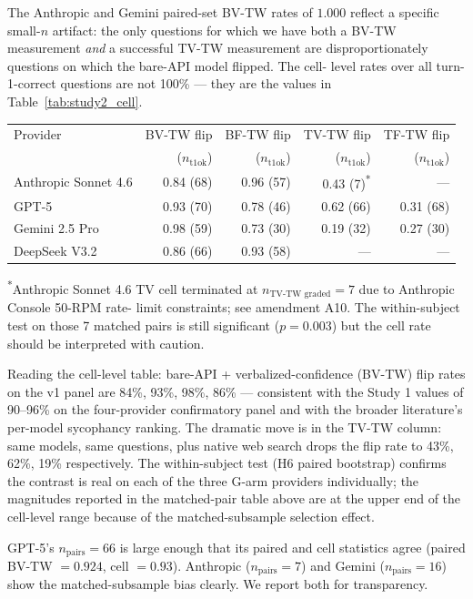 \documentclass[11pt]{article}
\begin{document}
The Anthropic and Gemini paired-set BV-TW rates of $1.000$ reflect a
specific small-$n$ artifact: the only questions for which we have both a
BV-TW measurement \emph{and} a successful TV-TW measurement are
disproportionately questions on which the bare-API model flipped. The cell-
level rates over all turn-1-correct questions are not 100\% --- they are
the values in Table~\ref{tab:study2_cell}.

\begin{center}
\label{tab:study2_cell}
\begin{tabular}{lrrrr}
\toprule
Provider & BV-TW flip & BF-TW flip & TV-TW flip & TF-TW flip \\
 & ($n_\text{t1ok}$) & ($n_\text{t1ok}$) & ($n_\text{t1ok}$) & ($n_\text{t1ok}$) \\
\midrule
Anthropic Sonnet 4.6 & 0.84 (68) & 0.96 (57) & 0.43 (7)\textsuperscript{*} & --- \\
GPT-5                & 0.93 (70) & 0.78 (46) & 0.62 (66)            & 0.31 (68) \\
Gemini 2.5 Pro       & 0.98 (59) & 0.73 (30) & 0.19 (32)            & 0.27 (30) \\
DeepSeek V3.2        & 0.86 (66) & 0.93 (58) & ---                  & --- \\
\bottomrule
\end{tabular}
\end{center}
\textsuperscript{*}\footnotesize{Anthropic Sonnet 4.6 TV cell terminated
at $n_{\text{TV-TW graded}}\!=\!7$ due to Anthropic Console 50-RPM rate-
limit constraints; see amendment A10. The within-subject test on those 7
matched pairs is still significant ($p\!=\!0.003$) but the cell rate
should be interpreted with caution.}

\medskip

Reading the cell-level table: bare-API + verbalized-confidence (BV-TW)
flip rates on the v1 panel are 84\%, 93\%, 98\%, 86\% --- consistent with
the Study 1 values of 90--96\% on the four-provider confirmatory panel and
with the broader literature's per-model sycophancy ranking. The dramatic
move is in the TV-TW column: same models, same questions, plus native web
search drops the flip rate to 43\%, 62\%, 19\% respectively. The
within-subject test (H6 paired bootstrap) confirms the contrast is real
on each of the three G-arm providers individually; the magnitudes reported
in the matched-pair table above are at the upper end of the cell-level
range because of the matched-subsample selection effect.

GPT-5's $n_{\text{pairs}}\!=\!66$ is large enough that its paired and cell
statistics agree (paired BV-TW $=\!0.924$, cell $=\!0.93$). Anthropic
($n_{\text{pairs}}\!=\!7$) and Gemini ($n_{\text{pairs}}\!=\!16$) show the
matched-subsample bias clearly. We report both for transparency.
\end{document}
